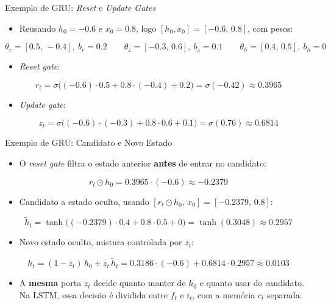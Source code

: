 \documentclass[aspectratio=169,xcolor=dvipsnames]{beamer}
\begin{document}
\begin{frame}{Exemplo de GRU: \textit{Reset} e \textit{Update Gates}}
\begin{itemize}\small
    \item Reusando $h_0 = -0.6$ e $x_0 = 0.8$, logo $[h_0, x_0] = [-0.6,\,0.8]$, com pesos:
\end{itemize}
\[
    \theta_r = [0.5,\,-0.4],\ b_r = 0.2 \qquad
    \theta_z = [-0.3,\,0.6],\ b_z = 0.1 \qquad
    \theta_h = [0.4,\,0.5],\ b_h = 0
\]
\begin{itemize}\small
    \item \textit{Reset gate}:
\end{itemize}
\[
    r_t = \sigma\bigl((-0.6)\cdot 0.5 + 0.8\cdot(-0.4) + 0.2\bigr) = \sigma(-0.42) \approx 0.3965
\]
\begin{itemize}\small
    \item \textit{Update gate}:
\end{itemize}
\[
    z_t = \sigma\bigl((-0.6)\cdot(-0.3) + 0.8\cdot 0.6 + 0.1\bigr) = \sigma(0.76) \approx 0.6814
\]
\end{frame}

\begin{frame}{Exemplo de GRU: Candidato e Novo Estado}
\begin{itemize}\small
    \item O \textit{reset gate} filtra o estado anterior \textbf{antes} de entrar no candidato:
\end{itemize}
\[
    r_t \odot h_0 = 0.3965 \cdot (-0.6) \approx -0.2379
\]
\begin{itemize}\small
    \item Candidato a estado oculto, usando $[r_t \odot h_0,\, x_0] = [-0.2379,\,0.8]$:
\end{itemize}
\[
    \tilde{h}_t = \tanh\bigl((-0.2379)\cdot 0.4 + 0.8\cdot 0.5 + 0\bigr) = \tanh(0.3048) \approx 0.2957
\]
\begin{itemize}\small
    \item Novo estado oculto, mistura controlada por $z_t$:
\end{itemize}
\[
    h_t = (1 - z_t)\,h_0 + z_t\,\tilde{h}_t = 0.3186\cdot(-0.6) + 0.6814\cdot 0.2957 \approx 0.0103
\]
\begin{itemize}\footnotesize
    \item A \textbf{mesma} porta $z_t$ decide quanto manter de $h_0$ e quanto usar do candidato. Na LSTM, essa decisão é dividida entre $f_t$ e $i_t$, com a memória $c_t$ separada.
\end{itemize}
\end{frame}
\end{document}
